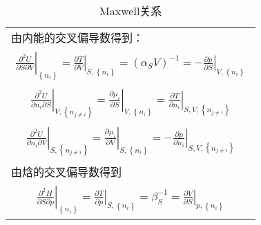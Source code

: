 \documentclass[main.tex]{subfiles}
\begin{document}
\begin{longtable}{m{}}
    \caption{Maxwell关系}\label{tab:Maxwell_relations}                                                                                                                                                                                                                                                 \\
    \hline
    由内能的交叉偏导数得到：                                                                                                                                                                                                                                                                                     \\[-4ex]
    \begin{align}
        \left.\frac{\partial^2 U}{\partial S\partial V}\right|_{\left\{n_i\right\}}              =\left.\frac{\partial T}{\partial V}\right|_{S,\left\{n_i\right\}}=\left(\alpha_S V\right)^{-1}=-\left.\frac{\partial p}{\partial S}\right|_{V,\left\{n_i\right\}}\label{eq:I.1_Maxwell_USV}\end{align} \\ [-8ex]
    \begin{align}\left.\frac{\partial ^2U}{\partial n_i\partial S}\right|_{V,\left\{n_{j\neq i}\right\}}  =\left.\frac{\partial \mu_i}{\partial S}\right|_{V,\left\{n_i\right\}}=\left.\frac{\partial T}{\partial n_i}\right|_{S,V,\left\{n_{j\neq i}\right\}}\label{eq:I.1_Maxwell_UnS}\end{align}  \\[-8ex]
    \begin{align}\left.\frac{\partial ^2U}{\partial n_i\partial V}\right|_{S,\left\{n_{j\neq i}\right\}}  =\left.\frac{\partial \mu_i}{\partial V}\right|_{S,\left\{n_i\right\}}=-\left.\frac{\partial p}{\partial n_i}\right|_{S,V,\left\{n_{j\neq i}\right\}}\label{eq:I.1_Maxwell_UnV}\end{align} \\
    由焓的交叉偏导数得到                                                                                                                                                                                                                                                                                       \\ [-4ex]
    \begin{align}
        \left.\frac{\partial^2 H}{\partial S\partial p}\right|_{\left\{n_i\right\}}              =\left.\frac{\partial T}{\partial p}\right|_{S,\left\{n_i\right\}}=\beta_S^{-1}=\left.\frac{\partial V}{\partial S}\right|_{p,\left\{n_i\right\}}\label{eq:I.1_Maxwell_HSp}\end{align}                  \\[-8ex]

\end{longtable}
\end{document}
